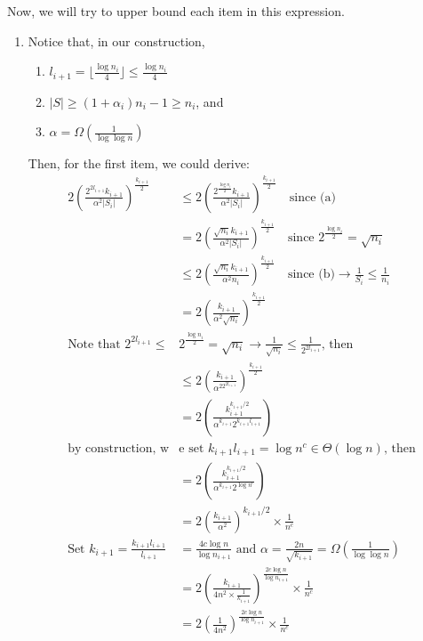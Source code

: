 \documentclass[a4paper, english]{paper}
\begin{document}
\quad	Now, we will try to upper bound each item in this expression.
	\begin{enumerate}
		\item Notice that, in our construction, 
		\begin{enumerate}
			\item $l_{i+1} = \lfloor\frac{\log n_i}{4}\rfloor\le\frac{\log n_i}{4}$
			\item $|S|\ge (1+\alpha_i)n_i-1\ge n_i$, and
			\item $\alpha = \Omega(\frac1{\log\log n})$
		\end{enumerate}
		Then, for the first item, we could derive:
		\begin{align*}
		2\left(\frac{2^{2l_{i+1}}k_{i+1}}{\alpha^2 |S_i|}\right)^{\frac{k_{i+1}}2}&\le 2\left(\frac{2^{\frac{\log n_i}{2}}k_{i+1}}{\alpha^2 |S_i|}\right)^{\frac{k_{i+1}}2}\quad\text{since (a)}\\
		& = 2\left(\frac{\sqrt{n_i}k_{i+1}}{\alpha^2 |S_i|}\right)^{\frac{k_{i+1}}2}\quad\text{since }2^{\frac{\log n_i}{2}} = \sqrt{n_i} \\
		& \le 2\left(\frac{\sqrt{n_i}k_{i+1}}{\alpha^2 n_i}\right)^{\frac{k_{i+1}}2}\quad\text{since (b)}\rightarrow\frac1{S_i}\le\frac1{n_i}\\
		& = 2\left(\frac{k_{i+1}}{\alpha^2\sqrt{n_i}}\right)^{\frac{k_{i+1}}2}\\
		\text{Note that }2^{2l_{i+1}}\le&2^{\frac{\log n_i}{2}} = \sqrt{n_i}\rightarrow \frac1{\sqrt{n_i}}\le\frac1{2^{2l_{i+1}}}\text{, then}\\
		& \le 2\left(\frac{k_{i+1}}{\alpha^22^{2l_{i+1}}}\right)^{\frac{k_{i+1}}2}\\
		& =  2\left(\frac{k_{i+1}^{k_{i+1}/2}}{\alpha^{k_{i+1}}2^{k_{i+1}l_{i+1}}}\right)\\
		\text{by construction, w}&\text{e set } k_{i+1}l_{i+1} = \log n^c \in \Theta(\log n )\text{, then}\\
		& =  2\left(\frac{k_{i+1}^{k_{i+1}/2}}{\alpha^{k_{i+1}}2^{\log n^c}}\right)\\
		& =  2\left(\frac{k_{i+1}}{\alpha^2}\right)^{k_{i+1}/2}\times\frac1{n^c}\\
		\text{Set } k_{i+1} = \frac{k_{i+1}l_{i+1}}{l_{i+1}}&=\frac{4c\log n}{\log n_{i+1}}\text{ and }\alpha = \frac{2n}{\sqrt{k_{i+1}}}=\Omega(\frac1{\log\log n})\\
		& = 2\left(\frac{k_{i+1}}{4n^2\times\frac1{k_{i+1}}}\right)^{\frac{2c\log n}{\log n_{i+1}}}\times\frac1{n^c}\\
		& = 2\left(\frac1{4n^2}\right)^{\frac{2c\log n}{\log n_{i+1}}}\times\frac1{n^c}\\

\end{align*}
\end{enumerate}
\end{document}
